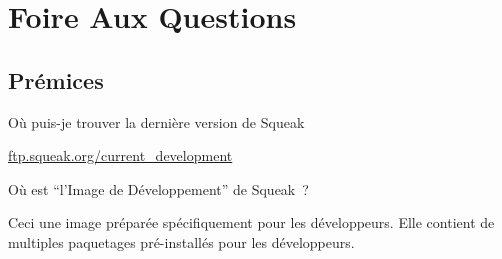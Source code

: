 \documentclass[a4paper,10pt,twoside]{book}
\begin{document}
	\renewcommand{\nnbb}[2]{} %
	\sloppy
\fi
  
\chapter{Foire Aux Questions}
\label{cha:faq}


\section{Pr\'emices}
\begin{faq}
O\`u puis-je trouver la derni\`ere version de Squeak
\end{faq}
\answer
\url{ftp.squeak.org/current_development}

\begin{faq}
O\`u est ``l'Image de D\'eveloppement'' de Squeak~?
\end{faq}
\answer
\squeakdev
Ceci une image pr\'epar\'ee sp\'ecifiquement pour les d\'eveloppeurs. Elle contient de multiples 
paquetages pr\'e-install\'es pour les d\'eveloppeurs.
\end{document}
